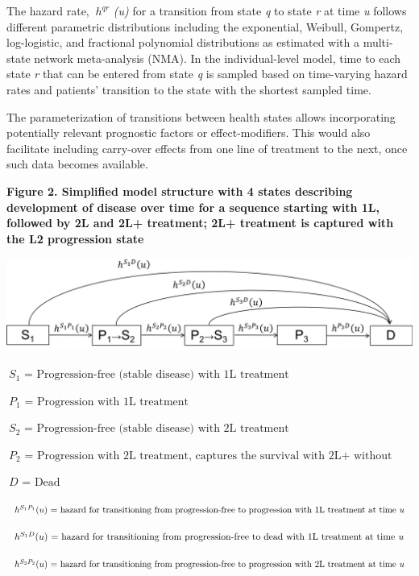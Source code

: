\documentclass[11pt,final,fleqn]{article}\usepackage[]{graphicx}\usepackage[]{color}
\theoremstyle{plain}
\begin{document}
{The hazard rate, $\ h^{qr} $ \textit{(u)} for a transition from state \textit{q} to state \textit{r} at time \textit{u} follows different parametric distributions including the exponential, Weibull, Gompertz, log-logistic, and fractional polynomial distributions as estimated with a multi-state network meta-analysis (NMA). In the individual-level model, time to each state \textit{r} that can be entered from state \textit{q} is sampled based on time-varying hazard rates and patients' transition to the state with the shortest sampled time.

The parameterization of transitions between health states allows incorporating potentially relevant prognostic factors or effect-modifiers. This would also facilitate including carry-over effects from one line of treatment to the next, once such data becomes available. 

\textbf{Figure 2. Simplified model structure with 4 states describing development of disease over time for a sequence starting with 1L, followed by 2L and 2L+ treatment; 2L+ treatment is captured with the L2 progression state}

\includegraphics[scale=0.3]{Figure 2.png} 


$\ S_{1} \textrm{ = Progression-free (stable disease) with 1L treatment }$

$\ P_{1} \textrm{ = Progression with 1L treatment }$

$\ S_{2} \textrm{ = Progression-free (stable disease) with 2L treatment }$

$\ P_{2} \textrm{ = Progression with 2L treatment, captures the survival with 2L+ without making a distinction between a progression free and progression phase }$

$\ D \textrm{ = Dead }$ 

$\ h^{S_{1}P_{1}} (u) \textrm{ = hazard for transitioning from progression-free to progression with 1L treatment at time \textit{u} } $ 

$\ h^{S_{1}D} (u) \textrm{ = hazard for transitioning from progression-free to dead with 1L treatment at time \textit{u} } $ 

$\ h^{S_{2}P_{2}} (u) \textrm{ = hazard for transitioning from progression-free to progression with 2L treatment at time \textit{u} } $ 

}
\end{document}
